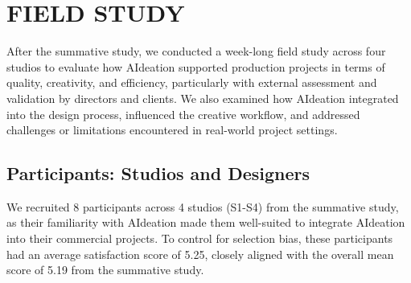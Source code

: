 




\section{FIELD STUDY}
After the summative study, we conducted a week-long field study across four studios to evaluate how AIdeation supported production projects in terms of quality, creativity, and efficiency, particularly with external assessment and validation by directors and clients. 
We also examined how AIdeation integrated into the design process, influenced the creative workflow, and addressed challenges or limitations encountered in real-world project settings.

\subsection{Participants: Studios and Designers}
We recruited 8 participants across 4 studios (S1-S4) from the summative study, as their familiarity with AIdeation made them well-suited to integrate AIdeation into their commercial projects. To control for selection bias, these participants had an average satisfaction score of 5.25, closely aligned with the overall mean score of 5.19 from the summative study.

